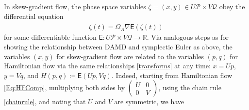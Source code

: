 \documentclass[11pt]{article}
\renewcommand{\P}{\mathcal{P}}
\newcommand{\R}{\mathbb{R}}
\newcommand{\Q}{\mathcal{Q}}
\begin{document}
In skew-gradient flow, the phase space variables $\zeta=(x,y)\in U\P\times V\Q$ obey the differential equation 
\begin{align}
    \dot \zeta(t) = \Omega_{A}\nabla \mathsf{E}(\zeta(t))\nonumber
\end{align}
for some differentiable function $\mathsf{E}:U\P\times V\Q\rightarrow\R$. Via analogous steps as for showing the relationship between DAMD and symplectic Euler as above, the variables $(x,y)$ for skew-gradient flow are related to the variables $(p,q)$ for Hamiltonian flow via the same relationships \eqref{transforms} at any time: $x=Up$, $y=Vq$, and $H\left(p,q\right)\coloneqq \mathsf{E}\left(Up,Vq\right)$. Indeed, starting from Hamiltonian flow \eqref{Eq:HFComp}, multiplying both sides by $\begin{pmatrix} U & 0 \\ 0 & V \end{pmatrix}$, using the chain rule \eqref{chainrule}, and noting that $U$ and $V$ are symmetric, we have
\end{document}
